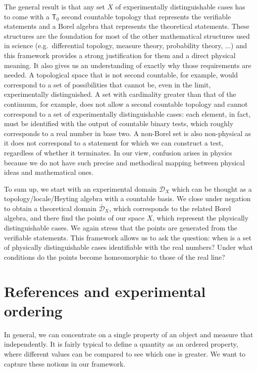 \documentclass{article}
\newcommand{\edomain}[1][D] {\mathcal{#1}} %
\newcommand{\tdomain}[1][D] {\bar{\mathcal{#1}}} %
\begin{document}
The general result is that any set $X$ of experimentally distinguishable cases has to come with a $\mathsf{T}_0$ second countable topology that represents the verifiable statements and a Borel algebra that represents the theoretical statements. These structures are the foundation for most of the other mathematical structures used in science (e.g.~differential topology, measure theory, probability theory, ...) and this framework provides a strong justification for them and a direct physical meaning. It also gives us an understanding of exactly why those requirements are needed. A topological space that is not second countable, for example, would correspond to a set of possibilities that cannot be, even in the limit, experimentally distinguished. A set with cardinality greater than that of the continuum, for example, does not allow a second countable topology and cannot correspond to a set of experimentally distinguishable cases: each element, in fact, must be identified with the output of countable binary tests, which roughly corresponds to a real number in base two. A non-Borel set is also non-physical as it does not correspond to a statement for which we can construct a test, regardless of whether it terminates. In our view, confusion arises in physics because we do not have such precise and methodical mapping between physical ideas and mathematical ones.

To sum up, we start with an experimental domain $\edomain_X$ which can be thought as a topology/locale/Heyting algebra with a countable basis. We close under negation to obtain a theoretical domain $\tdomain_X$, which corresponds to the related Borel algebra, and there find the points of our space $X$, which represent the physically distinguishable cases. We again stress that the points are generated from the verifiable statements. This framework allows us to ask the question: when is a set of physically distinguishable cases identifiable with the real numbers? Under what conditions do the points become homeomorphic to those of the real line?

\section{References and experimental ordering}

In general, we can concentrate on a single property of an object and measure that independently. It is fairly typical to define a quantity as an ordered property, where different values can be compared to see which one is greater. We want to capture these notions in our framework.
\end{document}

